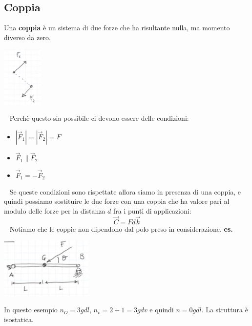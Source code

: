 \subsection{Coppia}
Una \textbf{coppia} è un sistema di due forze che ha risultante nulla, ma momento diverso da zero.\newline
{}
\begin{center}
    \includegraphics[height=3cm]{../lezione6/img11.JPG}
\end{center}
\ \newline
Perchè questo sia possibile ci devono essere delle condizioni:
\begin{itemize}
    \item $|\vec{F}_1| = |\vec{F}_2| = F$
    \item $\vec{F}_1 \parallel \vec{F}_2$
    \item $\vec{F}_1 = - \vec{F}_2$
\end{itemize}
\ \newline
Se queste condizioni sono rispettate allora siamo in presenza di una coppia, e quindi possiamo sostituire le due forze con una coppia che ha valore pari al modulo delle forze per la distanza $d$ fra i punti di applicazioni:
\[
    \vec{C} = F d \vec{k}
\]
\ \newline
Notiamo che le coppie non dipendono dal polo preso in considerazione.\newline
\newline
\textbf{es.} 
\begin{center}
    \includegraphics[height=3cm]{../lezione6/img12.JPG}
\end{center}
In questo esempio $n_O = 3 gdl$, $n_v = 2+1 = 3 gdv$ e quindi $n = 0 gdl$. La struttura è isostatica.\newline
